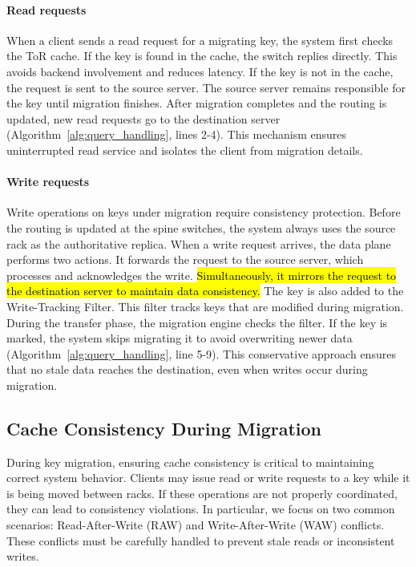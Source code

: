 \documentclass[conference]{IEEEtran}
\DeclareRobustCommand{\hlme}[1]{{\sethlcolor{white}\hl{#1}}}
\begin{document}
\paragraph{Read requests}
When a client sends a read request for a migrating key, the system first checks the ToR cache. If the key is found in the cache, the switch replies directly. This avoids backend involvement and reduces latency. If the key is not in the cache, the request is sent to the source server. The source server remains responsible for the key until migration finishes. After migration completes and the routing is updated, new read requests go to the destination server (Algorithm~\ref{alg:query_handling}, lines 2-4). This mechanism ensures uninterrupted read service and isolates the client from migration details.

\paragraph{Write requests}
Write operations on keys under migration require consistency protection. Before the routing is updated at the spine switches, the system always uses the source rack as the authoritative replica. When a write request arrives, the data plane performs two actions. It forwards the request to the source server, which processes and acknowledges the write. \hlme{Simultaneously, it mirrors the request to the destination server to maintain data consistency.} The key is also added to the Write-Tracking Filter. This filter tracks keys that are modified during migration. During the transfer phase, the migration engine checks the filter. If the key is marked, the system skips migrating it to avoid overwriting newer data (Algorithm~\ref{alg:query_handling}, line 5-9). This conservative approach ensures that no stale data reaches the destination, even when writes occur during migration.


\subsection{Cache Consistency During Migration}

During key migration, ensuring cache consistency is critical to maintaining correct system behavior. Clients may issue read or write requests to a key while it is being moved between racks. If these operations are not properly coordinated, they can lead to consistency violations. In particular, we focus on two common scenarios: Read-After-Write (RAW) and Write-After-Write (WAW) conflicts. These conflicts must be carefully handled to prevent stale reads or inconsistent writes.
\end{document}
